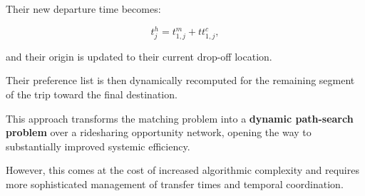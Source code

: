 \documentclass[12pt, a4paper]{article}
\begin{document}
Their new departure time becomes:

$$
t_j^h=t_{1,j}^m+tt_{1,j}^c,
$$

and their origin is updated to their current drop-off location.

Their preference list is then dynamically recomputed for the remaining segment of the trip toward the final destination.

This approach transforms the matching problem into a \textbf{dynamic path-search problem} over a ridesharing opportunity network, opening the way to substantially improved systemic efficiency.

However, this comes at the cost of increased algorithmic complexity and requires more sophisticated management of transfer times and temporal coordination.
\end{document}
